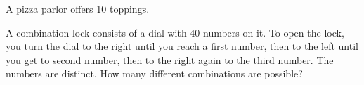 \begin{questions}


   
\question A pizza parlor offers 10 toppings.

  \begin{answer}
  \end{answer}



\question A combination lock consists of a dial with 40 numbers on it.  To open the lock, you turn the dial to the right until you reach a first number, then to the left until you get to second number, then to the right again to the third number.  The numbers are distinct.  How many different combinations are possible?


\end{questions}

